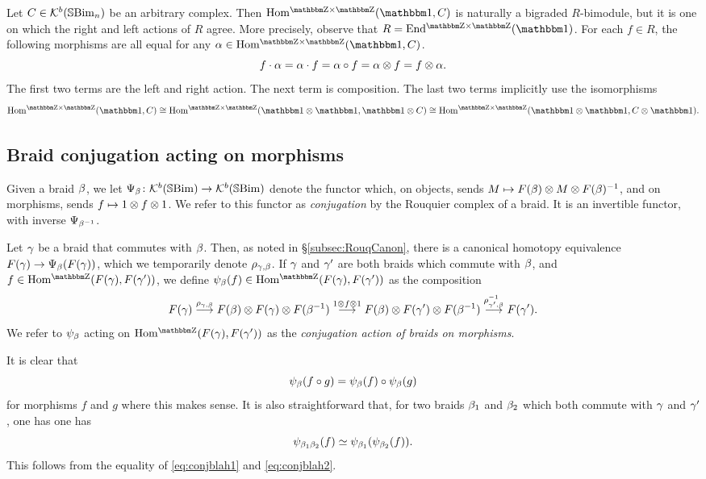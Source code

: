 Let $C \in {\mathcal{K}}^b({\mathbb{S}}{\rm Bim }_n)$ be an arbitrary complex. Then $\Homgg(\one,C)$ is naturally a bigraded $R$-bimodule, but it is one on which the right and left actions of $R$ agree. More precisely, observe that $R=\Endgg(\one)$.  For each $f\in R$, the following morphisms are all equal for any $\a \in \Homgg(\one,C)$.
\begin{equation} \label{eq:silly} f \cdot \alpha = \alpha \cdot f = \alpha \circ f = \alpha \otimes f = f \otimes \alpha. \end{equation}
The first two terms are the left and right action. The next term is composition. The last two terms implicitly use the isomorphisms \[\Homgg(\one, C) \cong \Homgg(\one \ot \one, \one \ot C) \cong \Homgg(\one \ot \one, C \ot \one).\]

\subsection{Braid conjugation acting on morphisms}
\label{subsec:conjugate}

Given a braid $\beta$, we let $\Psi_\beta \colon {\mathcal{K}}^b({\mathbb{S}}{\rm Bim }) \rightarrow {\mathcal{K}}^b({\mathbb{S}}{\rm Bim })$ denote the functor which, on objects, sends $M \mapsto F(\beta) \otimes M \otimes F(\beta)^{-1}$, and on morphisms, sends $f
\mapsto 1 \otimes f \otimes 1$. We refer to this functor as \emph{conjugation} by the Rouquier complex of a braid. It is an invertible functor, with inverse $\Psi_{\beta^{-1}}$.

Let $\gamma$ be a braid that commutes with $\beta$. Then, as noted in \S\ref{subsec:RouqCanon}, there is a canonical homotopy equivalence $F(\gamma) \rightarrow \Psi_{\beta}(F(\gamma))$, which we temporarily denote $\rho_{\gamma,\beta}$. If $\gamma$ and $\gamma'$ are both braids which commute with $\beta$, and $f \in \Homg(F(\g),F(\g'))$, we define $\psi_\b(f) \in \Homg(F(\g),F(\g'))$ as the composition
\begin{equation} F(\g) \buildrel {\rho_{\g,\b}} \over \longrightarrow F(\b) \ot F(\g) \ot F(\b\inv) \buildrel {1 \ot f \ot 1} \over \longrightarrow F(\b) \ot F(\g') \ot F(\b\inv) \buildrel {\rho_{\g',\b}\inv} \over \longrightarrow F(\g'). \end{equation}
We refer to $\psi_\beta$ acting on $\Homg(F(\g),F(\g'))$ as the \emph{conjugation action of braids on morphisms}.

It is clear that \begin{equation} \label{eq:conjfunctorial} \psi_\beta(f \circ g) = \psi_\beta(f) \circ \psi_\beta(g)\end{equation} for morphisms $f$ and $g$ where this makes sense. It is also straightforward that, for two braids $\beta_1$ and $\beta_2$ which both commute with $\gamma$ and $\gamma'$, one has
one has \begin{equation} \label{eq:conjisaction} \psi_{\beta_1 \beta_2}(f) \simeq \psi_{\beta_1}(\psi_{\beta_2}(f)). \end{equation}
This follows from the equality of \eqref{eq:conjblah1} and \eqref{eq:conjblah2}.


